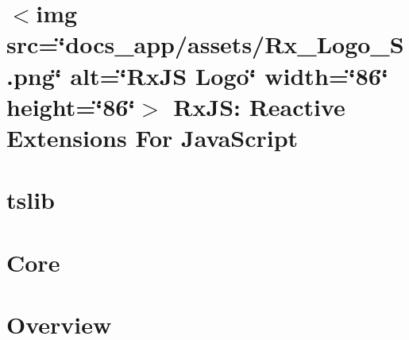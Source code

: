 \documentclass[twoside]{book}
\newcommand{\+}{\discretionary{\mbox{\scriptsize$\hookleftarrow$}}{}{}}
\begin{document}
\chapter{\texorpdfstring{$<$}{<}img src=\char`\"{}docs\+\_\+app/assets/\+Rx\+\_\+\+Logo\+\_\+\+S.\+png\char`\"{} alt=\char`\"{}\+Rx\+JS Logo\char`\"{} width=\char`\"{}86\char`\"{} height=\char`\"{}86\char`\"{}\texorpdfstring{$>$}{>} Rx\+JS\+: Reactive Extensions For Java\+Script}
\label{md__c___users_vaishnavi_jadhav__desktop__developer_code_mean_stack_example_client_node_modules__d5adb5a5a856ec51758c8e601dfa9778}

\chapter{tslib}
\label{md__c___users_vaishnavi_jadhav__desktop__developer_code_mean_stack_example_client_node_modules__1418041a5f8ecdd8effdedc3a33d582e}

\chapter{Core}
\label{md__c___users_vaishnavi_jadhav__desktop__developer_code_mean_stack_example_client_node_modules__e90467fda0ce4d7738e55ec0dcf3da17}

\chapter{Overview}
\label{md__c___users_vaishnavi_jadhav__desktop__developer_code_mean_stack_example_client_node_modules__5b44ebd463a966de4811eb605bb85b3b}

\end{document}
